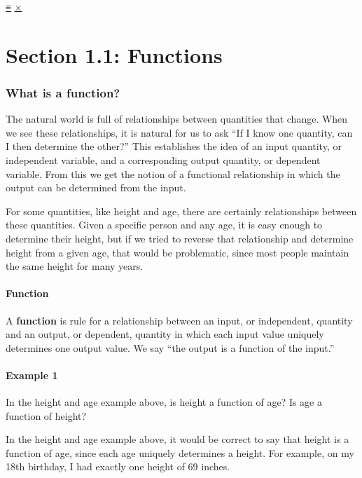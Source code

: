 \protect\hyperlink{main-nav}{≡} \protect\hyperlink{close-nav}{×}

\hypertarget{section-1.1-functions}{%
\section{Section 1.1: Functions}\label{section-1.1-functions}}

\hypertarget{what-is-a-function}{%
\subsubsection{What is a function?}\label{what-is-a-function}}

The natural world is full of relationships between quantities that
change. When we see these relationships, it is natural for us to ask
``If I know one quantity, can I then determine the other?'' This
establishes the idea of an input quantity, or independent variable, and
a corresponding output quantity, or dependent variable. From this we get
the notion of a functional relationship in which the output can be
determined from the input.

For some quantities, like height and age, there are certainly
relationships between these quantities. Given a specific person and any
age, it is easy enough to determine their height, but if we tried to
reverse that relationship and determine height from a given age, that
would be problematic, since most people maintain the same height for
many years.

\hypertarget{function}{%
\paragraph{Function}\label{function}}

A \textbf{function} is rule for a relationship between an input, or
independent, quantity and an output, or dependent, quantity in which
each input value uniquely determines one output value. We say ``the
output is a function of the input.''

\hypertarget{example-1}{%
\paragraph{Example 1}\label{example-1}}

In the height and age example above, is height a function of age? Is age
a function of height?

In the height and age example above, it would be correct to say that
height is a function of age, since each age uniquely determines a
height. For example, on my 18th birthday, I had exactly one height of 69
inches.


